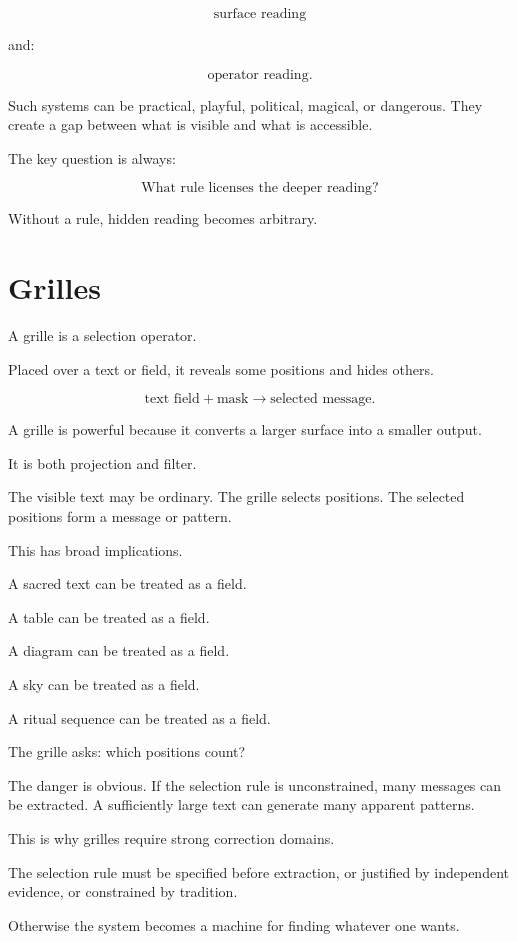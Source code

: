 \documentclass[11pt]{book}
\begin{document}
\[
\text{surface reading}
\]

and:

\[
\text{operator reading}.
\]

Such systems can be practical, playful, political, magical, or dangerous. They create a gap between what is visible and what is accessible.

The key question is always:

\[
\text{What rule licenses the deeper reading?}
\]

Without a rule, hidden reading becomes arbitrary.

\section{Grilles}

A grille is a selection operator.

Placed over a text or field, it reveals some positions and hides others.

\[
\text{text field} + \text{mask} \rightarrow \text{selected message}.
\]

A grille is powerful because it converts a larger surface into a smaller output.

It is both projection and filter.

The visible text may be ordinary. The grille selects positions. The selected positions form a message or pattern.

This has broad implications.

A sacred text can be treated as a field.

A table can be treated as a field.

A diagram can be treated as a field.

A sky can be treated as a field.

A ritual sequence can be treated as a field.

The grille asks: which positions count?

The danger is obvious. If the selection rule is unconstrained, many messages can be extracted. A sufficiently large text can generate many apparent patterns.

This is why grilles require strong correction domains.

The selection rule must be specified before extraction, or justified by independent evidence, or constrained by tradition.

Otherwise the system becomes a machine for finding whatever one wants.
\end{document}
